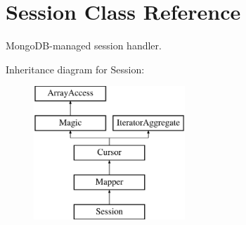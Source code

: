 \hypertarget{class_d_b_1_1_mongo_1_1_session}{}\section{Session Class Reference}
\label{class_d_b_1_1_mongo_1_1_session}


Mongo\+D\+B-\/managed session handler.  


Inheritance diagram for Session\+:\begin{figure}[H]
\begin{center}
\leavevmode
\includegraphics[height=5.000000cm]{class_d_b_1_1_mongo_1_1_session}
\end{center}
\end{figure}
